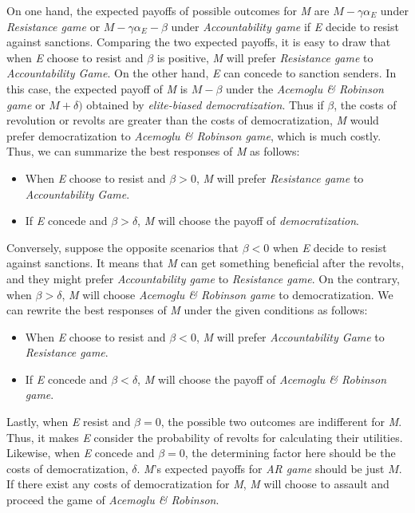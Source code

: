 \documentclass[11pt]{article}
\begin{document}
	On one hand, the expected payoffs of possible outcomes for \textit{M} are $M-\gamma\alpha_{E}$ under \textit{Resistance game} or $M-\gamma\alpha_{E}-\beta$ under \textit{Accountability game} if \textit{E} decide to resist against sanctions. Comparing the two expected payoffs, it is easy to draw that when \textit{E} choose to resist and $\beta$ is positive, \textit{M} will prefer \textit{Resistance game} to \textit{Accountability Game}. On the other hand, \textit{E} can concede to sanction senders. In this case, the expected payoff of \textit{M} is $M-\beta$ under the \textit{Acemoglu \& Robinson game} or $M+\delta)$ obtained by \textit{elite-biased democratization}. Thus if $\beta$, the costs of revolution or revolts are greater than the costs of democratization, \textit{M} would prefer democratization to \textit{Acemoglu \& Robinson game}, which is much costly. Thus, we can summarize the best responses of \textit{M} as follows:
	\begin{itemize}
		\item When \textit{E} choose to resist and $\beta > 0$, \textit{M} will prefer \textit{Resistance game} to \textit{Accountability Game}.
		\item If \textit{E} concede and $\beta > \delta$, \textit{M} will choose the payoff of \textit{democratization}.
	\end{itemize}
	
	Conversely, suppose the opposite scenarios that $\beta < 0$ when \textit{E} decide to resist against sanctions. It means that \textit{M} can get something beneficial after the revolts, and they might prefer \textit{Accountability game} to \textit{Resistance game}. On the contrary, when $\beta > \delta$, \textit{M} will choose \textit{Acemoglu \& Robinson game} to democratization. We can rewrite the best responses of \textit{M} under the given conditions as follows:
	\begin{itemize}
		\item When \textit{E} choose to resist and $\beta < 0$, \textit{M} will prefer \textit{Accountability Game} to \textit{Resistance game}.
		\item If \textit{E} concede and $\beta < \delta$, \textit{M} will choose the payoff of \textit{Acemoglu \& Robinson game}.
	\end{itemize}
	
	Lastly, when \textit{E} resist and $\beta = 0$, the possible two outcomes are indifferent for \textit{M}. Thus, it makes \textit{E} consider the probability of revolts for calculating their utilities. Likewise, when \textit{E} concede and $\beta = 0$, the determining factor here should be the costs of democratization, $\delta$. \textit{M}'s expected payoffs for \textit{AR game} should be just $M$. If there exist any costs of democratization for \textit{M}, \textit{M} will choose to assault and proceed the game of \textit{Acemoglu \& Robinson}. 
	
\end{document}
